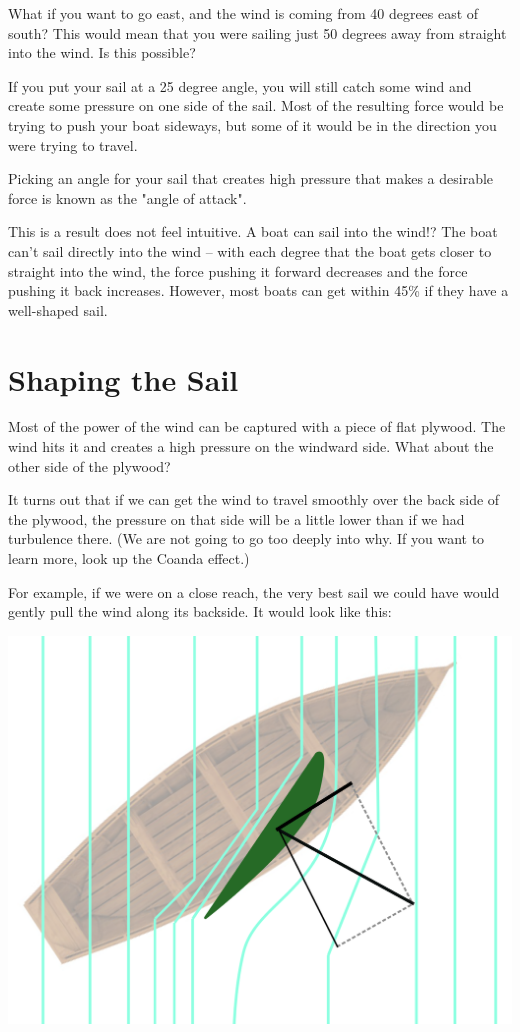 What if you want to go east,  and the wind is coming from 40 degrees east of south?  This would mean that you were sailing just 50 degrees away from
straight into the wind. Is this possible?

If you put your sail at a 25 degree angle, you will still catch some wind and create some pressure on one side of the sail.  Most of the resulting force would be trying to push
your boat sideways,  but some of it would be in the direction you were trying to travel.

Picking an angle for your sail that creates high pressure that makes a desirable force is known as the "angle of attack".

This is a result does not feel intuitive. A boat can sail into the wind!? The boat can't sail directly into the wind -- with each degree that the boat gets closer
to straight into the wind,  the force pushing it forward decreases and the force pushing it back increases. However,  most boats can get within 45\% if they have a well-shaped sail.

\section{Shaping the Sail}

Most of the power of the wind can be captured with a piece of flat plywood.  The wind hits it and creates a high pressure on the windward side. What about the other side of the plywood?

It turns out that if we can get the wind to travel smoothly over the back side of the plywood,   the pressure on that side will be a little lower than if we had turbulence there.   (We are not going
to go too deeply into why. If you want to learn more, look up the Coanda effect.)

For example, if we were on a close reach, the very best sail we could have would gently pull the wind along its backside.  It would look like this:

\begin{center}
    \includegraphics[width=.75\textwidth]{wing.png}
\end{center}

